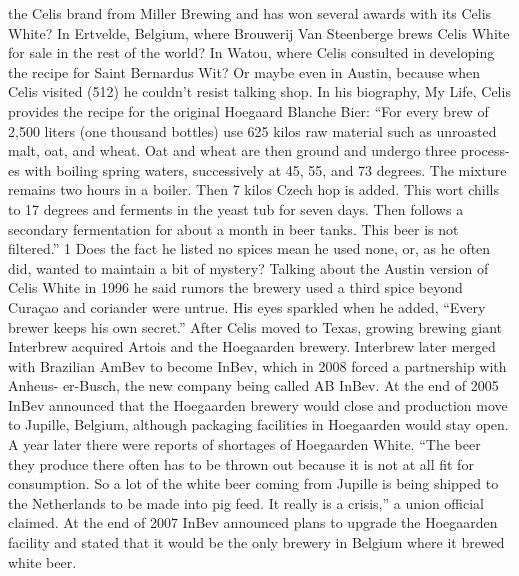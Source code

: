 \documentclass[a4paper,parskip=half]{scrartcl}
\begin{document}
the Celis brand from Miller Brewing and has won several awards with
its Celis White? In Ertvelde, Belgium, where Brouwerij Van Steenberge
brews Celis White for sale in the rest of the world? In Watou, where
Celis consulted in developing the recipe for Saint Bernardus Wit? Or
maybe even in Austin, because when Celis visited (512) he couldn’t
resist talking shop.
In his biography, My Life, Celis provides the recipe for the original
Hoegaard Blanche Bier: “For every brew of 2,500 liters (one thousand
bottles) use 625 kilos raw material such as unroasted malt, oat, and
wheat. Oat and wheat are then ground and undergo three process-
es with boiling spring waters, successively at 45, 55, and 73 degrees.
The mixture remains two hours in a boiler. Then 7 kilos Czech hop
is added. This wort chills to 17 degrees and ferments in the yeast tub
for seven days. Then follows a secondary fermentation for about a
month in beer tanks. This beer is not filtered.” 1 Does the fact he listed
no spices mean he used none, or, as he often did, wanted to maintain
a bit of mystery? Talking about the Austin version of Celis White in
1996 he said rumors the brewery used a third spice beyond Curaçao
and coriander were untrue. His eyes sparkled when he added, “Every
brewer keeps his own secret.”
After Celis moved to Texas, growing brewing giant Interbrew acquired
Artois and the Hoegaarden brewery. Interbrew later merged with Brazilian
AmBev to become InBev, which in 2008 forced a partnership with Anheus-
er-Busch, the new company being called AB InBev. At the end of 2005 InBev
announced that the Hoegaarden brewery would close and production move
to Jupille, Belgium, although packaging facilities in Hoegaarden would stay
open. A year later there were reports of shortages of Hoegaarden White.
“The beer they produce there often has to be thrown out because it is not
at all fit for consumption. So a lot of the white beer coming from Jupille
is being shipped to the Netherlands to be made into pig feed. It really is a
crisis,” a union official claimed. At the end of 2007 InBev announced plans
to upgrade the Hoegaarden facility and stated that it would be the only
brewery in Belgium where it brewed white beer.

\parencite[51]{Hieronymus2010}
\end{document}
